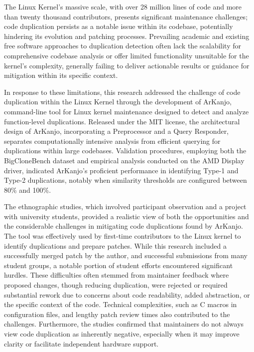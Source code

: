 The Linux Kernel's massive scale, with over 28 million lines of code 
and more than twenty thousand contributors, presents significant maintenance 
challenges; code duplication persists as a notable issue within its codebase, 
potentially hindering its evolution and patching processes. 
Prevailing academic and existing free software approaches to duplication 
detection often lack the scalability for comprehensive codebase analysis or 
offer limited functionality unsuitable for the kernel's complexity, 
generally failing to deliver actionable results or guidance for mitigation 
within its specific context.

In response to these limitations, this research addressed the challenge of 
code duplication within the Linux Kernel through the development of ArKanjo, 
command-line tool for Linux kernel maintenance designed to detect and 
analyze function-level duplications. Released under the MIT license, 
the architectural design of ArKanjo, incorporating a Preprocessor and a 
Query Responder, separates computationally intensive analysis from efficient 
querying for duplications within large codebases. 
Validation procedures, employing both the BigCloneBench dataset and empirical 
analysis conducted on the AMD Display driver, indicated ArKanjo's proficient 
performance in identifying Type-1 and Type-2 duplications, notably when 
similarity thresholds are configured between 80\% and 100\%.

The ethnographic studies, which involved participant observation and a project 
with university students, provided a realistic view of both the opportunities 
and the considerable challenges in mitigating code duplications found by ArKanjo. 
The tool was effectively used by first-time contributors to the Linux kernel to 
identify duplications and prepare patches. While this research included a
successfully merged patch by the author, and successful submissions from many 
student groups, a notable portion of student efforts 
encountered significant hurdles. These difficulties often stemmed from maintainer 
feedback where proposed changes, though reducing duplication, were rejected or 
required substantial rework due to concerns about code readability, added abstraction, 
or the specific context of the code. Technical complexities, such as C macros in 
configuration files, and lengthy patch review times also contributed to the challenges. 
Furthermore, the studies confirmed that maintainers do not always view code duplication 
as inherently negative, especially when it may improve clarity or facilitate 
independent hardware support.

